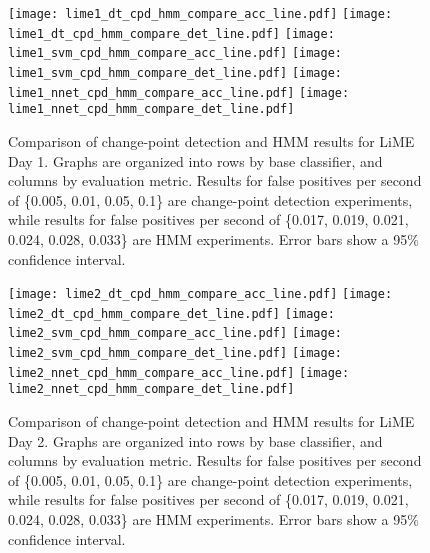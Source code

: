 \begin{figure}[h]
 \centering
 \texttt{[image: lime1\_dt\_cpd\_hmm\_compare\_acc\_line.pdf]} \hspace{1em}\vspace{1em}
 \texttt{[image: lime1\_dt\_cpd\_hmm\_compare\_det\_line.pdf]} 
 \texttt{[image: lime1\_svm\_cpd\_hmm\_compare\_acc\_line.pdf]} \hspace{1em}\vspace{1em}
 \texttt{[image: lime1\_svm\_cpd\_hmm\_compare\_det\_line.pdf]}
 \texttt{[image: lime1\_nnet\_cpd\_hmm\_compare\_acc\_line.pdf]} \hspace{1em}
 \texttt{[image: lime1\_nnet\_cpd\_hmm\_compare\_det\_line.pdf]}
 \caption{Comparison of change-point detection and HMM results for LiME Day 1.
  Graphs are organized into rows by base classifier, and columns by evaluation
  metric. Results for false positives per second of \{0.005, 0.01, 0.05, 0.1\} are change-point
  detection experiments, while results for false positives per second of
  \{0.017, 0.019, 0.021, 0.024, 0.028, 0.033\} are HMM experiments. Error bars
  show a 95\% confidence interval.}
 \label{fig:lime1_compare_cpd_hmm}
\end{figure}

\begin{figure}[h]
 \centering
 \texttt{[image: lime2\_dt\_cpd\_hmm\_compare\_acc\_line.pdf]} \hspace{1em}\vspace{1em}
 \texttt{[image: lime2\_dt\_cpd\_hmm\_compare\_det\_line.pdf]} 
 \texttt{[image: lime2\_svm\_cpd\_hmm\_compare\_acc\_line.pdf]} \hspace{1em}\vspace{1em}
 \texttt{[image: lime2\_svm\_cpd\_hmm\_compare\_det\_line.pdf]}
 \texttt{[image: lime2\_nnet\_cpd\_hmm\_compare\_acc\_line.pdf]} \hspace{1em}
 \texttt{[image: lime2\_nnet\_cpd\_hmm\_compare\_det\_line.pdf]}
 \caption{Comparison of change-point detection and HMM results for LiME Day 2.
  Graphs are organized into rows by base classifier, and columns by evaluation
  metric. Results for false positives per second of \{0.005, 0.01, 0.05, 0.1\} are change-point
  detection experiments, while results for false positives per second of
  \{0.017, 0.019, 0.021, 0.024, 0.028, 0.033\} are HMM experiments. Error bars
  show a 95\% confidence interval.}
 \label{fig:lime2_compare_cpd_hmm}
\end{figure}
